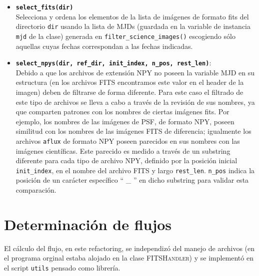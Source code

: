 \begin{itemize}
\item \textbf{\texttt{select\_fits(dir)}}\\
Selecciona y ordena los elementos de la lista de im\'agenes de formato fits del directorio \texttt{dir} usando la lista de MJDs (guardada en la variable de instancia \texttt{mjd} de la clase) generada en \texttt{filter\_science\_images()} escogiendo s\'olo aquellas cuyas fechas correspondan a las fechas indicadas.  %
\bigskip

\item \textbf{\texttt{select\_npys(dir, ref\_dir, init\_index, n\_pos, rest\_len)}}:\\
Debido a que los archivos de extensi\'on NPY no poseen la variable MJD en su estructura (en los archivos FITS encontramos este valor en el header de la imagen) deben de filtrarse de forma diferente. Para este caso el filtrado de este tipo de archivos se lleva a cabo a trav\'es de la revisi\'on de sus nombres, ya que comparten patrones con los nombres de ciertas im\'agenes fits. Por ejemplo, los nombres de las im\'agenes de PSF, de formato NPY, poseen similitud con los nombres de las im\'agenes FITS de diferencia; igualmente los archivos \texttt{aflux} de formato NPY poseen parecidos en sus nombres con las im\'agenes cient\'ificas. Este parecido es medido a trav\'es de un substring diferente para cada tipo de archivo NPY, definido por la posici\'on inicial \texttt{init\_index}, en el nombre del archivo FITS y largo \texttt{rest\_len}. \texttt{n\_pos} indica la posici\'on de un car\'acter espec\'ifico `` \_ '' en dicho substring para validar esta comparaci\'on.
\end{itemize}

\section{Determinaci\'on de flujos}
El c\'alculo del flujo, en este refactoring, se independiz\'o del manejo de archivos (en el programa orginal estaba alojado en la clase \textsc{FITSHandler}) y se implement\'o en el script \texttt{utils} pensado como librer\'ia.
\bigskip

